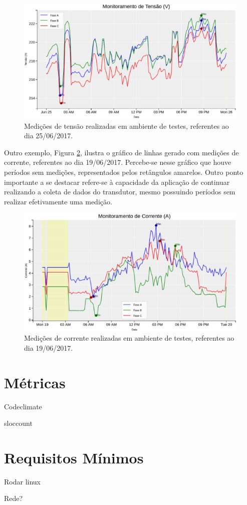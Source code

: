 \begin{figure}[!h]
    \centering
    \includegraphics[keepaspectratio=true,scale=0.5]{figuras/graph_1.eps}
    \caption{Medições de tensão realizadas em ambiente de testes, referentes ao dia 25/06/2017.}
    \label{graph_1}
\end{figure}

Outro exemplo, Figura \ref{graph_2}, ilustra o gráfico de linhas gerado com medições de corrente, referentes ao dia 19/06/2017. Percebe-se nesse gráfico que houve períodos sem medições, representados pelos retângulos amarelos. Outro ponto importante a se destacar refere-se à capacidade da aplicação de continuar realizando a coleta de dados do transdutor, mesmo possuindo períodos sem realizar efetivamente uma medição.

\begin{figure}[!h]
    \centering
    \includegraphics[keepaspectratio=true,scale=0.5]{figuras/graph_2.eps}
    \caption{Medições de corrente realizadas em ambiente de testes, referentes ao dia 19/06/2017.}
    \label{graph_2}
\end{figure}

\section{Métricas}
Codeclimate

sloccount

\section{Requisitos Mínimos}
    Rodar linux

    Rede?